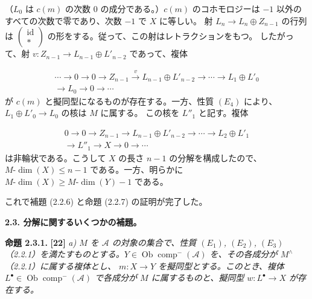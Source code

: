 \clearpage
{}%
\begingroup\small\setlength{\parskip}{0pt}\setlength{\emergencystretch}{1.5em}
\setlength{\abovedisplayskip}{4pt plus 2pt minus 2pt}%
\setlength{\belowdisplayskip}{4pt plus 2pt minus 2pt}%

（$L_0$ は $c(m)$ の次数 $0$ の成分である。）$c(m)$ のコホモロジーは
$-1$ 以外のすべての次数で零であり、次数 $-1$ で $X$ に等しい。
射 $L_n\longrightarrow L_n\oplus Z_{n-1}$ の行列は
$\begin{pmatrix}\operatorname{id}\\ *\end{pmatrix}$ の形をする。従って、この射はレトラクションをもつ。
したがって、射 $v\colon Z_{n-1}\longrightarrow L_{n-1}\oplus L'_{n-2}$ であって、複体

\[
\begin{aligned}
\cdots\longrightarrow0\longrightarrow0\longrightarrow Z_{n-1}
\xrightarrow{v}L_{n-1}\oplus L'_{n-2}\longrightarrow\cdots
\longrightarrow L_1\oplus L'_0\\
\longrightarrow L_0\longrightarrow0\longrightarrow\cdots
\end{aligned}
\]
が $c(m)$ と擬同型になるものが存在する。一方、性質
$(E_4)$ により、$L_1\oplus L'_0\longrightarrow L_0$ の核は $M$ に属する。
この核を $L''_1$ と記す。複体

\[
\begin{aligned}
0\longrightarrow0\longrightarrow Z_{n-1}
\longrightarrow L_{n-1}\oplus L'_{n-2}\longrightarrow\cdots
\longrightarrow L_2\oplus L'_1\\
\longrightarrow L''_1\longrightarrow X\longrightarrow0\longrightarrow\cdots
\end{aligned}
\]
は非輪状である。こうして $X$ の長さ $n-1$ の分解を構成したので、
$M\text{-}\dim(X)\leq n-1$ である。一方、明らかに
$M\text{-}\dim(X)\geq M\text{-}\dim(Y)-1$ である。

これで補題 (2.2.6) と命題 (2.2.7) の証明が完了した。

\medskip\noindent\textbf{2.3. 分解に関するいくつかの補題。}

\medskip\noindent\textbf{命題 2.3.1.} \textbf{[22]}\quad
\textit{a) $M$ を $\mathcal A$ の対象の集合で、性質 $(E_1)$, $(E_2)$, $(E_3)$
（2.2.1）を満たすものとする。$Y\in\operatorname{Ob}\operatorname{comp}^{-}(\mathcal A)$
を、その各成分が $M^\wedge$（2.2.1）に属する複体とし、
$m\colon X\longrightarrow Y$ を擬同型とする。このとき、複体
$L^\bullet\in\operatorname{Ob}\operatorname{comp}^{-}(\mathcal A)$ で各成分が $M$ に属するものと、擬同型
$w\colon L^\bullet\longrightarrow X$ が存在する。}

